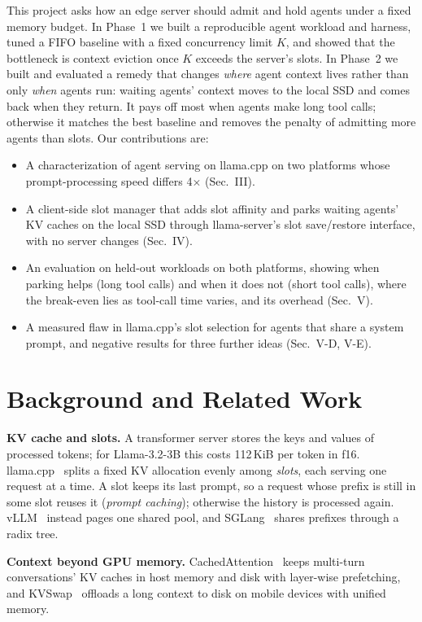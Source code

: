 \documentclass[conference,letterpaper]{IEEEtran}
\begin{document}
This project asks how an edge server should admit and hold agents under a fixed memory budget. In Phase~1 we built a reproducible agent workload and harness, tuned a FIFO baseline with a fixed concurrency limit $K$, and showed that the bottleneck is context eviction once $K$ exceeds the server's slots. In Phase~2 we built and evaluated a remedy that changes \emph{where} agent context lives rather than only \emph{when} agents run: waiting agents' context moves to the local SSD and comes back when they return. It pays off most when agents make long tool calls; otherwise it matches the best baseline and removes the penalty of admitting more agents than slots. Our contributions are:
\begin{itemize}
\item A characterization of agent serving on llama.cpp on two platforms whose prompt-processing speed differs 4$\times$ (Sec.~III).
\item A client-side slot manager that adds slot affinity and parks waiting agents' KV caches on the local SSD through llama-server's slot save/restore interface, with no server changes (Sec.~IV).
\item An evaluation on held-out workloads on both platforms, showing when parking helps (long tool calls) and when it does not (short tool calls), where the break-even lies as tool-call time varies, and its overhead (Sec.~V).
\item A measured flaw in llama.cpp's slot selection for agents that share a system prompt, and negative results for three further ideas (Sec.~V-D, V-E).
\end{itemize}

\section{Background and Related Work}
\textbf{KV cache and slots.} A transformer server stores the keys and values of processed tokens; for Llama-3.2-3B this costs 112\,KiB per token in f16. llama.cpp~\cite{llamacpp} splits a fixed KV allocation evenly among \emph{slots}, each serving one request at a time. A slot keeps its last prompt, so a request whose prefix is still in some slot reuses it (\emph{prompt caching}); otherwise the history is processed again. vLLM~\cite{kwon2023vllm} instead pages one shared pool, and SGLang~\cite{zheng2024sglang} shares prefixes through a radix tree.

\textbf{Context beyond GPU memory.} CachedAttention~\cite{gao2024cachedattention} keeps multi-turn conversations' KV caches in host memory and disk with layer-wise prefetching, and KVSwap~\cite{zhang2025kvswap} offloads a long context to disk on mobile devices with unified memory.
\end{document}
